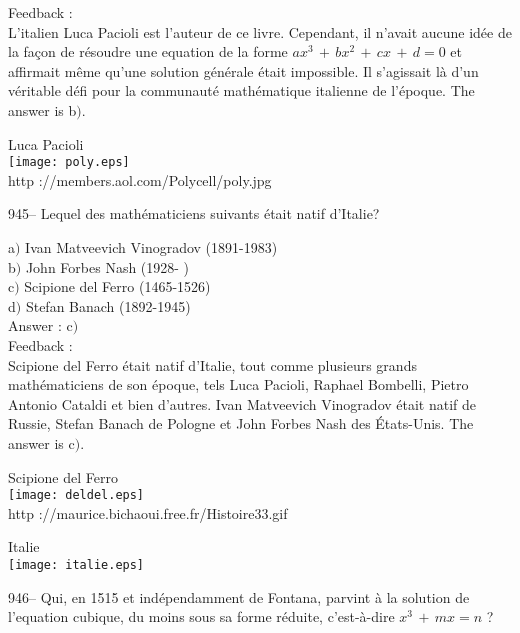 \documentclass[letterpaper, 12pt]{article}
\begin{document}
Feedback : \\
L'italien Luca Pacioli est l'auteur de ce livre. Cependant, il
n'avait aucune id\'ee de la fa\c con de r\'esoudre une equation de
la forme $ax^3\,+\,bx^2\,+\,cx\,+\,d=0$ et affirmait m\^eme qu'une
solution g\'en\'erale \'etait impossible. Il s'agissait l\`a d'un
v\'eritable d\'efi pour la communaut\'e math\'ematique italienne de
l'\'epoque. The answer is b$)$.\\

        \begin{center}
        Luca Pacioli\\
    \texttt{[image: poly.eps]}\\
        {\footnotesize http ://members.aol.com/Polycell/poly.jpg}
    \end{center}

945-- Lequel des math\'ematiciens suivants \'etait natif d'Italie?

a$)$ Ivan Matveevich Vinogradov (1891-1983)\\
b$)$ John Forbes Nash (1928- ) \\
c$)$ Scipione del Ferro (1465-1526) \\
d$)$ Stefan Banach (1892-1945) \\

Answer : c$)$\\

Feedback :\\
Scipione del Ferro \'etait natif d'Italie, tout comme plusieurs
grands math\'ematiciens de son \'epoque, tels Luca Pacioli, Raphael
Bombelli, Pietro Antonio Cataldi et bien d'autres. Ivan Matveevich
Vinogradov
\'etait natif de Russie, Stefan Banach de Pologne et John Forbes Nash des
\'Etats-Unis. The answer is c$)$.\\

        \begin{center}
        Scipione del Ferro\\
    \texttt{[image: deldel.eps]}\\
        {\footnotesize http ://maurice.bichaoui.free.fr/Histoire33.gif}
    \end{center}

        \begin{center}
        Italie\\
    \texttt{[image: italie.eps]}\\
    \end{center}

946-- Qui, en 1515 et ind\'ependamment de Fontana, parvint \`a la
solution de l'equation cubique, du moins sous sa forme r\'eduite,
c'est-\`a-dire $x^3\,+\,mx=n$ ?
\end{document}
